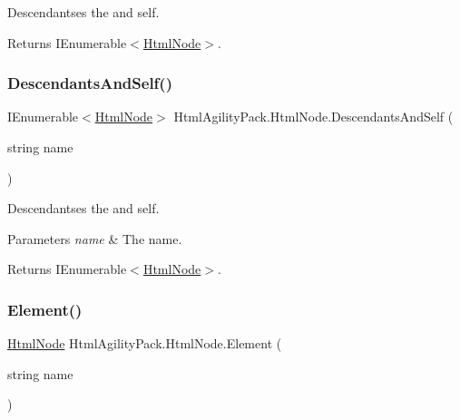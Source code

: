 Descendantses the and self. 

\begin{DoxyReturn}{Returns}
I\+Enumerable$<$\hyperlink{class_html_agility_pack_1_1_html_node}{Html\+Node}$>$.
\end{DoxyReturn}
\mbox{\label{class_html_agility_pack_1_1_html_node_a7e08733bc7087a8e81b56316e67cb325}} 
\subsubsection{\texorpdfstring{Descendants\+And\+Self()}{DescendantsAndSelf()}\hspace{0.1cm}{\footnotesize\ttfamily [2/2]}}
{\footnotesize\ttfamily I\+Enumerable$<$\hyperlink{class_html_agility_pack_1_1_html_node}{Html\+Node}$>$ Html\+Agility\+Pack.\+Html\+Node.\+Descendants\+And\+Self (\begin{DoxyParamCaption}\item[{string}]{name }\end{DoxyParamCaption})\hspace{0.3cm}{\ttfamily [inline]}}



Descendantses the and self. 


\begin{DoxyParams}{Parameters}
{\em name} & The name.\\
\hline
\end{DoxyParams}
\begin{DoxyReturn}{Returns}
I\+Enumerable$<$\hyperlink{class_html_agility_pack_1_1_html_node}{Html\+Node}$>$.
\end{DoxyReturn}
\mbox{\label{class_html_agility_pack_1_1_html_node_ad6ff37ffc534bd5ba0c90ca373516cc3}} 
\subsubsection{\texorpdfstring{Element()}{Element()}}
{\footnotesize\ttfamily \hyperlink{class_html_agility_pack_1_1_html_node}{Html\+Node} Html\+Agility\+Pack.\+Html\+Node.\+Element (\begin{DoxyParamCaption}\item[{string}]{name }\end{DoxyParamCaption})\hspace{0.3cm}{\ttfamily [inline]}}



